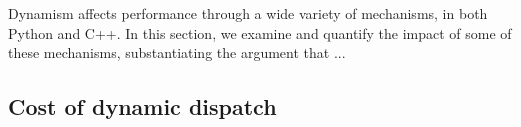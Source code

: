







Dynamism affects performance through a wide variety of mechanisms, in both Python and C++.
In this section, we examine and quantify the impact of some of these mechanisms, substantiating the argument that ...

\subsection{Cost of dynamic dispatch}



